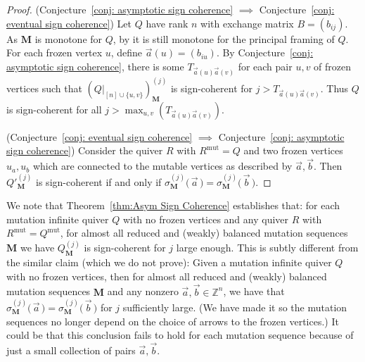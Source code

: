 \documentclass[12pt]{amsart}
\theoremstyle{definition}
\theoremstyle{remark}
\numberwithin{equation}{section}
\newcommand{\Z} { \mathbb{Z}}
\newcommand{\mut} {\text{mut}}
\begin{document}
\begin{proof}
(Conjecture~\ref{conj: asymptotic sign coherence} $\implies$ Conjecture~\ref{conj: eventual sign coherence}) 
Let $Q$ have rank $n$ with exchange matrix $B = (b_{ij})$. As $\mathbf M$ is monotone for $Q$, by \cite[Theorem 4.6]{FZiv} it is still monotone for the principal framing of $Q$.
For each frozen vertex $u$, define $\vec{a}(u) = (b_{iu})$.
By Conjecture~\ref{conj: asymptotic sign coherence}, there is some $T_{\vec{a}(u) \vec{a}(v)}$ for each pair $u,v$ of frozen vertices such that $(Q|_{[n] \cup \{u,v\}})_{\mathbf M}^{(j)}$ is sign-coherent for $j > T_{\vec{a}(u) \vec{a}(v)}$.
Thus $Q$ is sign-coherent for all $j > \max_{u,v}(T_{\vec{a}(u) \vec{a}(v)})$.

(Conjecture~\ref{conj: eventual sign coherence} $\implies$ Conjecture~\ref{conj: asymptotic sign coherence}) 
Consider the quiver $R$ with $R^{\mut} = Q$ and two frozen vertices $u_a,u_b$ which are connected to the mutable vertices as described by $\vec{a}, \vec{b}.$
Then $Q'^{(j)}_{\mathbf M}$ is sign-coherent if and only if $\sigma^{(j)}_{\mathbf M}\big ( \, \vec a \,\big) = \sigma^{(j)}_{\mathbf M}\big ( \, \vec b \,\big)$.
\end{proof}

We note that Theorem~\ref{thm:Asym Sign Coherence} establishes that:
for each mutation infinite quiver $Q$ with no frozen vertices and any quiver $R$ with $R^{\mut}=Q^{\mut}$, for almost all reduced and (weakly) balanced mutation sequences $\mathbf M$ we have $Q^{(j)}_{\mathbf M}$ is sign-coherent for $j$ large enough.
This is subtly different from the similar claim (which we do not prove): 
Given a mutation infinite quiver $Q$ with no frozen vertices, then for almost all reduced and (weakly) balanced mutation sequences $\mathbf M$ and any nonzero $\vec a, \vec b \in \Z^n$, we have that $\sigma^{(j)}_{\mathbf M}\big ( \, \vec a \,\big) = \sigma^{(j)}_{\mathbf M}\big ( \, \vec b \,\big)$ for $j$ sufficiently large.
(We have made it so the mutation sequences no longer depend on the choice of arrows to the frozen vertices.)
It could be that this conclusion fails to hold for each mutation sequence because of just a small collection of pairs $\vec a, \vec b$.




 
\end{document}

